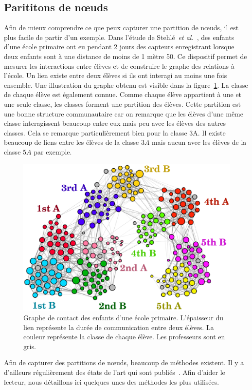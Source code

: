 \subsection{Parititons de n\oe uds}
\label{subsec:Part_noeuds}
Afin de mieux comprendre ce que peux capturer une partition de n\oe uds, il est plus facile de partir d'un exemple.
Dans l'étude de Stehlé~\emph{et al.}~\cite{Stehle2011}, des enfants d'une école primaire ont eu pendant 2 jours des capteurs enregistrant lorsque deux enfants sont à une distance de moins de 1 mètre 50.
Ce dispositif permet de mesurer les interactions entre élèves et de construire le graphe des relations à l'école.
Un lien existe entre deux élèves si ils ont interagi au moins une fois ensemble.
Une illustration du graphe obtenu est visible dans la figure~\ref{fig:ecole_primaire}.
La classe de chaque élève est également connue.
Comme chaque élève appartient à une et une seule classe, les classes forment une partition des élèves.
Cette partition est une bonne structure communautaire car on remarque que les élèves d'une même classe interagissent beaucoup entre eux mais peu avec les élèves des autres classes.
Cela se remarque particulièrement bien pour la classe 3A.
Il existe beaucoup de liens entre les élèves de la classe $3A$ mais aucun avec les élèves de la classe $5A$ par exemple.

\begin{figure}
\centering
\includegraphics[width=0.6\linewidth]{img/Intro/ecole_primaire}
\caption{Graphe de contact des enfants d'une école primaire. L'épaisseur du lien représente la durée de communication entre deux élèves. La couleur représente la classe de chaque élève. Les professeurs sont en gris.\protect\footnotemark}
\label{fig:ecole_primaire}
\end{figure}

Afin de capturer des partitions de n\oe uds, beaucoup de méthodes existent.
Il y a d'ailleurs régulièrement des états de l'art qui sont publiés~\cite{Fortunato2010,Plantie2013a, Malliaros2013a, Harenberg2014a}.
Afin d'aider le lecteur, nous détaillons ici quelques unes des méthodes les plus utilisées.

